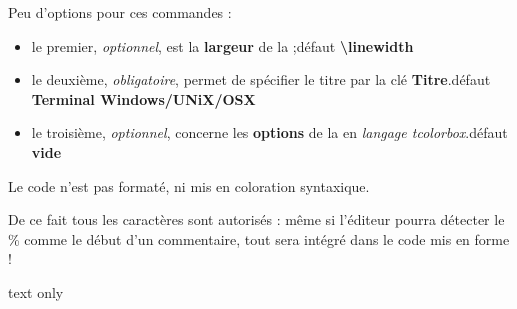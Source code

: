\documentclass[a4paper,french,11pt]{article}
\newcommand\ctex[1]{\tcbox[vignettelatex]{#1}}
\newcommand\Cle[1]{{\bfseries\sffamily\textlangle \textcolor{orange!75!black}{#1}\textrangle}}
\begin{document}
\begin{cautionblock}
Peu d'options pour ces commandes :

\begin{itemize}
	\item le premier, \textit{optionnel}, est la \Cle{largeur} de la \ctex{tcbox} ;\hfill{}défaut \Cle{\textbackslash linewidth}
	\item le deuxième, \textit{obligatoire}, permet de spécifier le titre par la clé \Cle{Titre}.\hfill{}défaut \Cle{Terminal Windows/UNiX/OSX}
	\item le troisième, \textit{optionnel}, concerne les \Cle{options} de la \ctex{tcbox} en \textit{langage tcolorbox}.\hfill{}défaut \Cle{vide}
\end{itemize}
\vspace*{-\baselineskip}\leavevmode
\end{cautionblock}

\begin{noteblock}
Le \textsf{code} n'est pas formaté, ni mis en coloration syntaxique.

De ce fait tous les caractères sont autorisés : même si l'éditeur pourra détecter le \% comme le début d'un commentaire, tout sera intégré dans le code mis en forme !
\end{noteblock}


\begin{PresCodeSortiePL}{text only}
\end{PresCodeSortiePL}
\end{document}
